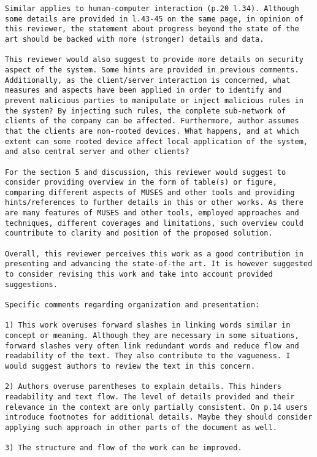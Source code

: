 \documentclass[preprint]{elsarticle}
\begin{document}
\begin{verbatim}
Similar applies to human-computer interaction (p.20 l.34). Although some details are provided in l.43-45 on the same page, in opinion of this reviewer, the statement about progress beyond the state of the art should be backed with more (stronger) details and data.

This reviewer would also suggest to provide more details on security aspect of the system. Some hints are provided in previous comments. Additionally, as the client/server interaction is concerned, what measures and aspects have been applied in order to identify and prevent malicious parties to manipulate or inject malicious rules in the system? By injecting such rules, the complete sub-network of clients of the company can be affected. Furthermore, author assumes that the clients are non-rooted devices. What happens, and at which extent can some rooted device affect local application of the system, and also central server and other clients?

For the section 5 and discussion, this reviewer would suggest to consider providing overview in the form of table(s) or figure, comparing different aspects of MUSES and other tools and providing hints/references to further details in this or other works. As there are many features of MUSES and other tools, employed approaches and techniques, different coverages and limitations, such overview could countribute to clarity and position of the proposed solution.

Overall, this reviewer perceives this work as a good contribution in presenting and advancing the state-of-the art. It is however suggested to consider revising this work and take into account provided suggestions.

Specific comments regarding organization and presentation:

1) This work overuses forward slashes in linking words similar in concept or meaning. Although they are necessary in some situations, forward slashes very often link redundant words and reduce flow and readability of the text. They also contribute to the vagueness. I would suggest authors to review the text in this concern.

2) Authors overuse parentheses to explain details. This hinders readability and text flow. The level of details provided and their relevance in the context are only partially consistent. On p.14 users introduce footnotes for additional details. Maybe they should consider applying such approach in other parts of the document as well.

3) The structure and flow of the work can be improved.
\end{verbatim}


\end{document}
